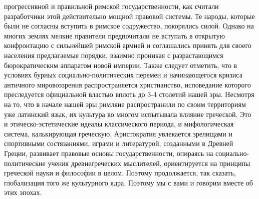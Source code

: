 прогрессивной и правильной римской государственности, как считали разработчики
этой действительно мощной правовой системы. Те народы, которые были не согласны
вступить в римское содружество, покорялись силой. Однако на многих землях мелкие
правители предпочитали не вступать в открытую конфронтацию с сильнейшей римской
армией и соглашались принять для своего населения предлагаемые порядки, взаимно
проникая с разрастающимся бюрократическим аппаратом новой империи. Также следует
отметить, что в условиях бурных социально-политических перемен и начинающегося
кризиса античного мировоззрения распространяется христианство, исповедание
которого преследуется официальной властью вплоть до 3-4 столетий нашей эры.
Несмотря на то, что в начале нашей эры римляне распространили по своим
территориям уже латинский язык, их культура во многом испытывала влияние
греческой. Это и этическо-эстетические идеалы классического периода, и
мифологическая система, калькирующая греческую. Аристократия увлекается
зрелищами и спортивными состязаниями, играми и литературой, созданными в Древней
Греции, развивает правовые основы государственности, опираясь на социально-
политические учения древнегреческих мыслителей, ориентируется на принципы
греческой науки и философии в целом. Поэтому продолжается, так сказать,
глобализация того же культурного ядра. Поэтому мы с вами и говорим вместе об
этих эпохах. 

